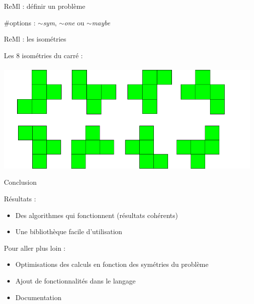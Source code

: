 \documentclass{beamer}
\begin{document}
\begin{frame}{ReMl : définir un problème}



\#options :  
\emph{$\sim$sym}, \emph{$\sim$one} ou \emph{$\sim$maybe}
 
 \end{frame}


\begin{frame}{ReMl : les isométries}

Les 8 isométries du carré : \\
~\\

\includegraphics[scale=0.5]{../imports/transformations.pdf}
\end{frame}




\begin{frame}{Conclusion}

Résultats :  
\begin{itemize}
\item Des algorithmes qui fonctionnent (résultats cohérents)
\item Une bibliothèque facile d'utilisation
\end{itemize}

Pour aller plus loin : 
\begin{itemize}
\item Optimisations des calculs en fonction des symétries du problème
\item Ajout de fonctionnalités dans le langage
\item Documentation
\end{itemize}



\end{frame}
\end{document}
